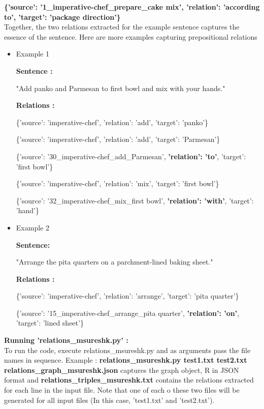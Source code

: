 \documentclass[11pt,letterpaper]{article}
\begin{document}
\textbf{\{'source': '1\_imperative-chef\_prepare\_cake mix', 'relation': 'according to', 'target': 'package direction'\}}\\

Together, the two relations extracted for the example sentence captures the essence of the sentence. Here are more examples capturing prepositional relations
\begin{itemize}
    \item Example 1
    
    \textbf{Sentence : }
    
    "Add panko and Parmesan to first bowl and mix with your hands."
    
    \textbf{Relations : }
    
    \{'source': 'imperative-chef', 'relation': 'add', 'target': 'panko'\}
    
    \{'source': 'imperative-chef', 'relation': 'add', 'target': 'Parmesan'\}
    
    \{'source': '30\_imperative-chef\_add\_Parmesan', \textbf{'relation': 'to'}, 'target': 'first bowl'\}
    
    \{'source': 'imperative-chef', 'relation': 'mix', 'target': 'first bowl'\}
    
    \{'source': '32\_imperative-chef\_mix\_first bowl', \textbf{'relation': 'with'}, 'target': 'hand'\}
    
    \item Example 2
    
    \textbf{Sentence:}
    
    "Arrange the pita quarters on a parchment-lined baking sheet."
    
     \textbf{Relations : }
     
     \{'source': 'imperative-chef', 'relation': 'arrange', 'target': 'pita quarter'\}
     
    \{'source': '15\_imperative-chef\_arrange\_pita quarter', \textbf{'relation': 'on'}, 'target': 'lined sheet'\}
    
\end{itemize}
\textbf{Running 'relations\_msureshk.py' :}\\

To run the code, execute relations\_msureshk.py and as arguments pass the file names in sequence. Example : \textbf{relations\_msureshk.py test1.txt test2.txt}\\

\textbf{relations\_graph\_msureshk.json} captures the graph object, R in JSON format and \textbf{relations\_triples\_msureshk.txt} contains the relations extracted for each line in the input file. Note that one of each o these two files will be generated for all input files (In this case, 'test1.txt' and 'test2.txt'). 
\end{document}
